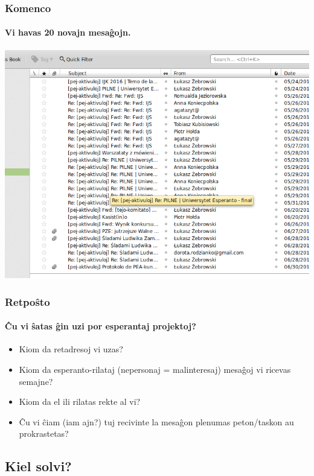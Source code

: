   \begin{frame}
    \frametitle{Komenco}
    \framesubtitle{Vi havas 20 novajn mesaĝojn.}
    
  \begin{center}
    	\includegraphics[scale=0.3]{ekranoj/retposhto}
	\end{center}
  \end{frame}
 

  \begin{frame}
    \frametitle{Retpoŝto}
    \framesubtitle{Ĉu vi ŝatas ĝin uzi por esperantaj projektoj?}
    \begin{itemize}
    	\item Kiom da retadresoj vi uzas?
    	\item Kiom da esperanto-rilataj (nepersonaj = malinteresaj) mesaĝoj vi ricevas semajne?
    	\item Kiom da el ili rilatas rekte al vi?
    	\item Ĉu vi ĉiam (iam ajn?) tuj recivinte la mesaĝon plenumas peton/taskon au prokrastetas?
    \end{itemize}
  \end{frame}
   
   
\subsection{Kiel solvi?}
   
